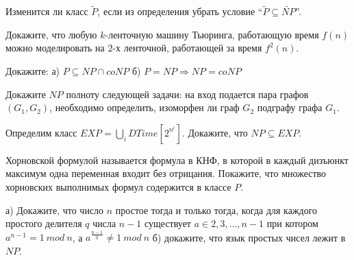 \setcounter{curtask}{7}


\begin{task}
    Изменится ли класс $\widetilde{P}$, если из определения убрать условие
    ``$\widetilde{P} \subseteq \widetilde{NP}$''.
\end{task}

\begin{task}
    Докажите, что любую $k$-ленточную машину Тьюринга, работающую время $f(n)$ можно
    моделировать на $2$-х ленточной, работающей за время $f^2(n)$.
\end{task}

\begin{task}
	Докажите:
    а) $P \subseteq NP \cap coNP$
    б) $P = NP \Rightarrow NP = coNP$
\end{task}

\begin{task}
    Докажите $NP$ полноту следующей задачи:
    на вход подается пара графов $(G_1, G_2)$, необходимо определить, изоморфен ли
    граф $G_2$ подграфу графа $G_1$.
\end{task}

\breakline

\begin{ptask}{2}
    Определим класс $EXP = \bigcup\limits_{i}DTime[2^{n^i}]$. Докажите, что
    $NP \subseteq EXP$.
\end{ptask}

\begin{ptask}{3}
    Хорновской формулой называется формула в КНФ, в которой в каждый дизъюнкт
    максимум одна переменная входит без отрицания. Покажите, что множество
    хорновских выполнимых формул содержится в классе $P$.
\end{ptask}

\begin{ptask}{4}
    а) Докажите, что число $n$ простое тогда и только тогда, когда для каждого
    простого делителя $q$ числа $n - 1$ существует $a \in {2, 3, \dots, n - 1}$ при котором
    $a^{n - 1} = 1~mod~n$, а $a^{\frac{n - 1}{q}} \ne 1~mod~n$
    б) докажите, что язык простых чисел лежит в $NP$.
\end{ptask}